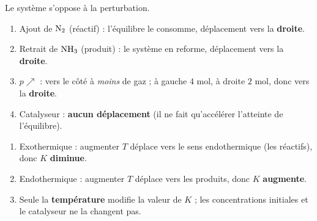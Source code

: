 \documentclass[11pt,a4paper]{article}
\newcommand{\rep}[1]{\textcolor{primarydark}{\textbf{#1}}}
\begin{document}
\begin{correction}
Le système s'oppose à la perturbation.
\begin{enumerate}[label=\alph*),leftmargin=2em,topsep=2pt,itemsep=2pt]
  \item Ajout de $\ce{N2}$ (réactif) : l'équilibre le consomme, déplacement vers la \rep{droite}.
  \item Retrait de $\ce{NH3}$ (produit) : le système en reforme, déplacement vers la \rep{droite}.
  \item $p\nearrow$ : vers le côté à \emph{moins} de gaz ; à gauche $4$ mol, à droite $2$ mol, donc vers la
        \rep{droite}.
  \item Catalyseur : \rep{aucun déplacement} (il ne fait qu'accélérer l'atteinte de l'équilibre).
\end{enumerate}
\end{correction}

\begin{correction}
\begin{enumerate}[label=\alph*),leftmargin=2em,topsep=2pt,itemsep=2pt]
  \item Exothermique : augmenter $T$ déplace vers le sens endothermique (les réactifs), donc $K$ \rep{diminue}.
  \item Endothermique : augmenter $T$ déplace vers les produits, donc $K$ \rep{augmente}.
  \item Seule la \rep{température} modifie la valeur de $K$ ; les concentrations initiales et le catalyseur
        ne la changent pas.
\end{enumerate}
\end{correction}
\end{document}
